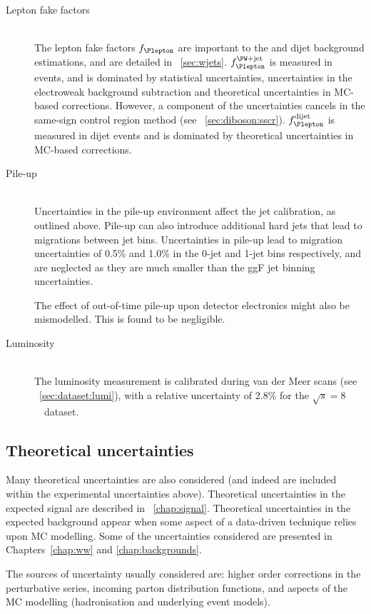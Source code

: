 \begin{description}
\item[Lepton fake factors] \hfill \\
	The lepton fake factors $f_{\Plepton}$ are important to the \Wjets and dijet background 
	estimations, and are detailed in \Section~\ref{sec:wjets}. $f_{\Plepton}^{\text{\Wjets}}$
	is measured in \Zjets events, and is dominated by statistical uncertainties, 
	uncertainties in the electroweak background subtraction and theoretical uncertainties in 
	MC-based corrections. However, a component of the uncertainties cancels in the same-sign 
	control region method (see \Section~\ref{sec:diboson:sscr}). 
	$f_{\Plepton}^{\text{dijet}}$ is measured in dijet events and is dominated by 
	theoretical uncertainties in MC-based corrections.

\item[Pile-up] \hfill \\
	Uncertainties in the pile-up environment affect the jet calibration, as outlined above. 
	Pile-up can also introduce additional hard jets that lead to migrations between jet bins.
	Uncertainties in pile-up lead to migration uncertainties of 0.5\% and 1.0\% in the 0-jet 
	and 1-jet bins respectively, and are neglected as they are much smaller than the ggF 
	jet binning uncertainties.

	The effect of out-of-time pile-up upon detector electronics might also be mismodelled. 
	This is found to be negligible.

\item[Luminosity] \hfill \\
	The luminosity measurement is calibrated during van der Meer scans (see 
	\Section~\ref{sec:dataset:lumi}), with a relative uncertainty of 2.8\% for the 
	\unit{$\sqrt{s} = 8$}{\TeV} dataset.

\end{description}



\subsection{Theoretical uncertainties}
\label{sec:syst:theor}

Many theoretical uncertainties are also considered (and indeed are included within the 
experimental uncertainties above). Theoretical uncertainties in the expected signal are 
described in \Chapter~\ref{chap:signal}. Theoretical uncertainties in the expected 
background appear when some aspect of a data-driven technique relies upon MC modelling. 
Some of the uncertainties considered are presented in Chapters~\ref{chap:ww} and 
\ref{chap:backgrounds}.

The sources of uncertainty usually considered are: higher order corrections in the 
perturbative series, incoming parton distribution functions, and aspects of the MC modelling 
(\eg hadronisation and underlying event models).

